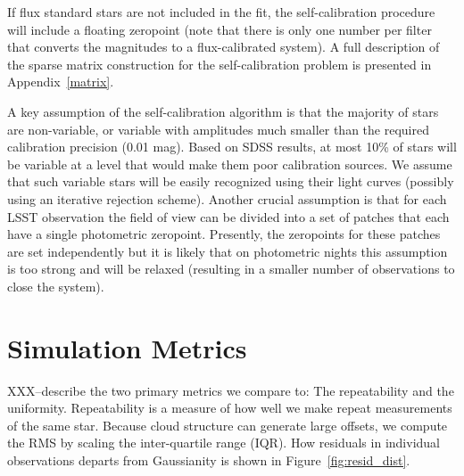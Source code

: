 \documentclass[12pt,preprint]{aastex}
\begin{document}

If flux standard stars are not included in the fit, the
self-calibration procedure will include a floating zeropoint (note
that there is only one number per filter that converts the magnitudes
to a flux-calibrated system).  A full description of the sparse matrix
construction for the self-calibration problem is presented in
Appendix~\ref{matrix}.  


A key assumption of the self-calibration algorithm is that the
majority of stars are non-variable, or variable with amplitudes much
smaller than the required calibration precision (0.01 mag). Based on
SDSS results, at most 10\% of stars will be variable at a level that
would make them poor calibration sources.  We assume that such
variable stars will be easily recognized using their light curves
(possibly using an iterative rejection scheme).  Another crucial
assumption is that for each LSST observation the field of view can be
divided into a set of patches that each have a single photometric
zeropoint. Presently, the zeropoints for these patches are set
independently but it is likely that on photometric nights this
assumption is too strong and will be relaxed (resulting in a smaller
number of observations to close the system).






\section{Simulation Metrics}

XXX--describe the two primary metrics we compare to:  The repeatability and the uniformity.  Repeatability is a measure of how well we make repeat measurements of the same star.  Because cloud structure can generate large offsets, we compute the RMS by scaling the inter-quartile range (IQR).  How residuals in individual observations departs from Gaussianity is shown in Figure~\ref{fig:resid_dist}.
\end{document}
